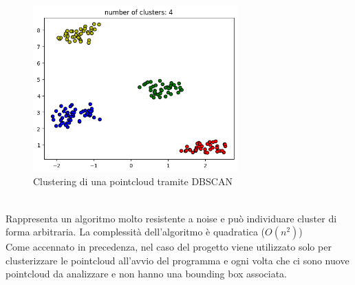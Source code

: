\documentclass[italian]{report}
\begin{document}
\begin{figure}[H]
	\centering
	\includegraphics[width=0.7\textwidth]{dbscan}
	\footnotesize
	\caption{Clustering di una pointcloud tramite DBSCAN}	
\end{figure}\\
Rappresenta un algoritmo molto resistente a noise e può individuare cluster di forma arbitraria. La complessità dell'algoritmo è quadratica ($O(n^2)$)\\
Come accennato in precedenza, nel caso del progetto viene utilizzato solo per clusterizzare le pointcloud all'avvio del programma e ogni volta che ci sono nuove pointcloud da analizzare e non hanno una bounding box associata.
\end{document}
